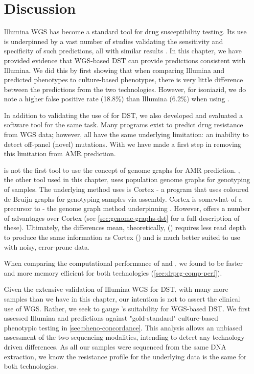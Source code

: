 \section{Discussion}
Illumina WGS has become a standard tool for \mtb{} drug susceptibility testing. Its use is underpinned by a vast number of studies validating the sensitivity and specificity of such predictions, all with similar results \cite{cryptic2018,hunt2019,bradley2015,coll2015,walker2015,kohl2018,phelan2019}. In this chapter, we have provided evidence that \ont{} WGS-based DST can provide predictions consistent with Illumina. We did this by first showing that when comparing Illumina and \ont{} predicted phenotypes to culture-based phenotypes, there is very little difference between the predictions from the two technologies. However, for isoniazid, we do note a higher \ont{} false positive rate (18.8\%) than Illumina (6.2\%) when using \mykrobe{}.

In addition to validating the use of \ont{} for DST, we also developed and evaluated a software tool \drprg{} for the same task. Many programs exist to predict drug resistance from WGS data; however, all have the same underlying limitation: an inability to detect off-panel (novel) mutations. With \drprg{} we have made a first step in removing this limitation from \mtb{} AMR prediction.

\drprg{} is not the first tool to use the concept of genome graphs for AMR prediction. \mykrobe{}, the other tool used in this chapter, uses population genome graphs for genotyping of samples. The underlying method \mykrobe{} uses is Cortex \cite{iqbal2012} - a program that uses coloured de Bruijn graphs for genotyping samples via \denovo{} assembly. Cortex is somewhat of a precursor to \pandora{} - the genome graph method underpinning \drprg{}. However, \pandora{} offers a number of advantages over Cortex (see \autoref{sec:genome-graphs-dst} for a full description of these). Ultimately, the differences mean, theoretically, \pandora{} (\drprg{}) requires less read depth to produce the same information as Cortex (\mykrobe{}) and is much better suited to use with noisy, error-prone \ont{} data. 

When comparing the computational performance of \mykrobe{} and \drprg{}, we found \drprg{} to be faster and more memory efficient for both technologies (\autoref{sec:drprg-comp-perf}).

\noindent
Given the extensive validation of Illumina WGS for DST, with many more samples than we have in this chapter, our intention is not to assert the clinical use of WGS. Rather, we seek to gauge \ont{}'s suitability for WGS-based DST. We first assessed Illumina and \ont{} predictions against "gold-standard" culture-based phenotypic testing in \autoref{sec:pheno-concordance}. This analysis allows an unbiased assessment of the two sequencing modalities, intending to detect any technology-driven differences. As all our samples were sequenced from the same DNA extraction, we know the resistance profile for the underlying data is the same for both technologies. 

